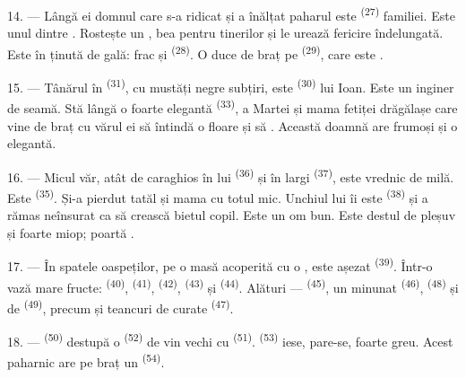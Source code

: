 14. --- Lângă ei domnul care s-a ridicat și a înălțat paharul este
 \textsuperscript{(27)} familiei. Este unul dintre
. Rostește un , bea pentru
 tinerilor și le urează fericire îndelungată. Este în ținută de
gală: frac și  \textsuperscript{(28)}. O duce de braț pe
 \textsuperscript{(29)}, care este .

15. --- Tânărul în  \textsuperscript{(31)}, cu mustăți negre subțiri,
este  \textsuperscript{(30)} lui Ioan. Este un inginer de seamă.
Stă lângă o  foarte elegantă \textsuperscript{(33)},
 a Martei și mama fetiței drăgălașe care vine de braț cu
vărul ei să întindă o floare și să  . Această
doamnă are  frumoși și o  elegantă.

16. --- Micul văr, atât de caraghios în  lui \textsuperscript{(36)}
și în  largi \textsuperscript{(37)}, este vrednic de milă.
Este  \textsuperscript{(35)}. Și-a pierdut tatăl și mama cu totul
mic. Unchiul lui îi este  \textsuperscript{(38)} și a rămas
neînsurat ca să crească bietul copil. Este un om bun. Este destul de pleșuv și
foarte miop; poartă .

\VUsaut{2.4mm}
\VUsaut{3.0mm}

17. --- În spatele oaspeților, pe o masă acoperită cu o ,
este așezat  \textsuperscript{(39)}. Într-o vază mare fructe:
 \textsuperscript{(40)},  \textsuperscript{(41)},
 \textsuperscript{(42)},  \textsuperscript{(43)} și
 \textsuperscript{(44)}. Alături --- 
\textsuperscript{(45)}, un  minunat \textsuperscript{(46)},
 \textsuperscript{(48)} și de 
\textsuperscript{(49)}, precum și teancuri de  curate
\textsuperscript{(47)}.

18. ---  \textsuperscript{(50)} destupă o 
\textsuperscript{(52)} de vin vechi cu 
\textsuperscript{(51)}.  \textsuperscript{(53)} iese, pare-se, foarte
greu. Acest paharnic are pe braț un  \textsuperscript{(54)}.

